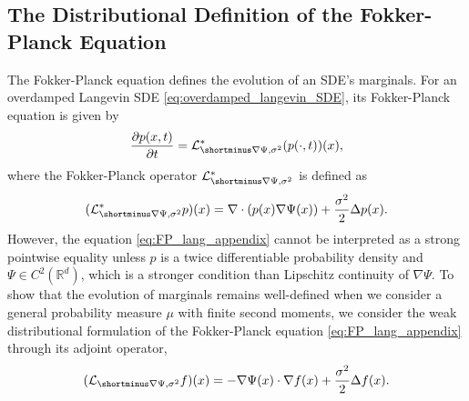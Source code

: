 \documentclass[twoside]{article}
\newcommand{\R} {\mathbb R}
\begin{document}


\subsection{The Distributional Definition of the Fokker-Planck Equation}
\label{subsec:weak_FP}

The Fokker-Planck equation defines the evolution of an SDE's marginals. For an overdamped Langevin SDE \eqref{eq:overdamped_langevin_SDE}, its Fokker-Planck equation is given by
\begin{align}
    \frac{\partial p(x,t)}{\partial t} = \mathcal{L}^*_{\shortminus \nabla \Psi, \sigma^2}(p(\cdot,t))(x),
    \label{eq:FP_lang_appendix}
\end{align}
where the Fokker-Planck operator $\mathcal{L}^*_{\shortminus \nabla \Psi, \sigma^2}$ is defined as
\begin{align*}
(\mathcal{L}^*_{\shortminus \nabla \Psi, \sigma^2}p)(x)= \nabla \cdot(p(x) \nabla \Psi(x)) + \frac{\sigma^2}{2}\Delta p(x).
\end{align*}
However, the equation \eqref{eq:FP_lang_appendix} cannot be interpreted as a strong pointwise equality unless $p$ is a twice differentiable probability density and $\Psi \in C^2(\R^d)$, which is a stronger condition than Lipschitz continuity of $\nabla \Psi$. To show that the evolution of marginals remains well-defined when we consider a general probability measure $\mu$ with finite second moments, we consider the weak distributional formulation of the Fokker-Planck equation \eqref{eq:FP_lang_appendix} through its adjoint operator,
\begin{align*}
(\mathcal{L}_{\shortminus \nabla \Psi, \sigma^2}f)(x)=-\nabla \Psi(x) \cdot \nabla f(x)  + \frac{\sigma^2}{2}\Delta f(x).
\end{align*} 
\end{document}
